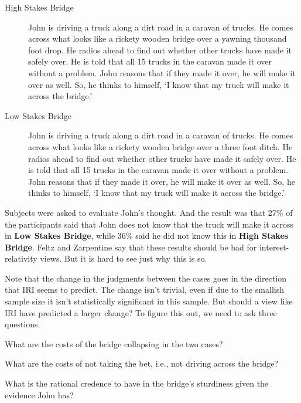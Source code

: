\documentclass[oneside]{book}
\begin{document}
\begin{description}
\item[High Stakes Bridge] John is driving a truck along a dirt road in a caravan of trucks. He comes across what looks like a rickety wooden bridge over a yawning thousand foot drop. He radios ahead to find out whether other trucks have made it safely over. He is told that all 15 trucks in the caravan made it over without a problem. John reasons that if they made it over, he will make it over as well. So, he thinks to himself, `I know that my truck will make it across the bridge.'

\item[Low Stakes Bridge] John is driving a truck along a dirt road in a caravan of trucks. He comes across what looks like a rickety wooden bridge over a three foot ditch. He radios ahead to find out whether other trucks have made it safely over. He is told that all 15 trucks in the caravan made it over without a problem. John reasons that if they made it over, he will make it over as well. So, he thinks to himself, `I know that my truck will make it across the bridge.' \citep[696]{FeltzZarpentine2010}
\end{description}

\noindent Subjects were asked to evaluate John's thought. And the result was that 27\% of the participants said that John does not know that the truck will make it across in \textbf{Low Stakes Bridge}, while 36\% said he did not know this in \textbf{High Stakes Bridge}. Feltz and Zarpentine say that these results should be bad for interest-relativity views. But it is hard to see just why this is so.

Note that the change in the judgments between the cases goes in the direction that IRI seems to predict. The change isn't trivial, even if due to the smallish sample size it isn't statistically significant in this sample. But should a view like IRI have predicted a larger change? To figure this out, we need to ask three questions.

\begin{enumerate*}
\item What are the costs of the bridge collapsing in the two cases?
\item What are the costs of not taking the bet, i.e., not driving across the bridge?
\item What is the rational credence to have in the bridge's sturdiness given the evidence John has?
\end{enumerate*}
\end{document}
